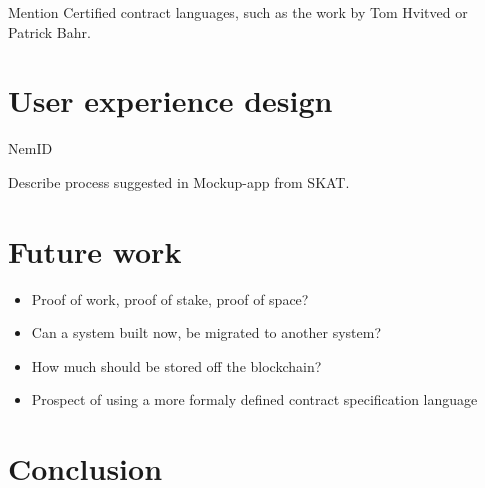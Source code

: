 \documentclass[oneside,a4paper,10pts,article]{memoir}
\begin{document}
Mention Certified contract languages, such as the work by Tom Hvitved
or Patrick Bahr.

\chapter{User experience design}
NemID

Describe process suggested in Mockup-app from SKAT.

\chapter{Future work}
\label{sec:futurework}

\begin{itemize}
\item Proof of work, proof of stake, proof of space?
\item Can a system built now, be migrated to another system?
\item How much should be stored off the blockchain?
\item Prospect of using a more formaly defined contract specification language
\end{itemize}

\chapter{Conclusion}
\label{sec:conclusion}



\end{document}
